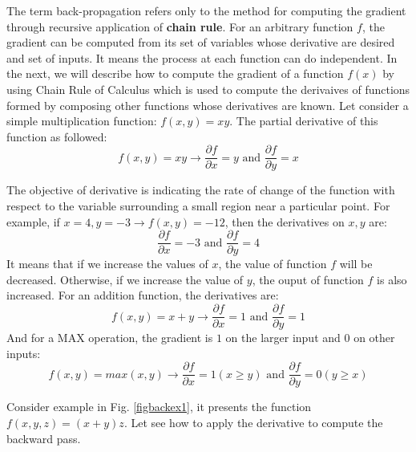 The term back-propagation refers only to the method for computing the gradient through recursive application of \textbf{chain rule}. For an arbitrary function $f$, the gradient can be computed from its set of variables whose derivative are desired and set of inputs. It means the process at each function can do independent. In the next, we will describe how to compute the gradient of a function $f(x)$ by using Chain Rule of Calculus which is used to compute the derivaives of functions formed by composing other functions whose derivatives are known.
Let consider a simple multiplication function: $f(x,y) = xy$. The partial derivative of this function as followed:
\begin{equation}
	f(x,y) = xy \rightarrow \frac{\partial f}{\partial x} = y \text{ and } \frac{\partial f}{\partial y} = x
\end{equation}

The objective of derivative is indicating the rate of change of the function with respect to the variable surrounding a small region near a particular point. For example, if $x = 4, y = -3 \rightarrow f(x,y) = -12$, then the derivatives on $x, y$ are:
\begin{equation}
	\frac{\partial f}{\partial x} = -3 \text{ and } \frac{\partial f}{\partial y} = 4
\end{equation}
It means that if we increase the values of $x$, the value of function $f$ will be decreased. Otherwise, if we increase the value of $y$, the ouput of function $f$ is also increased.
For an addition function, the derivatives are:
\begin{equation}
	f(x,y) = x + y \rightarrow \frac{\partial f}{\partial x} = 1 \text{ and } \frac{\partial f}{\partial y} = 1
\end{equation}
And for a MAX operation, the gradient is $1$ on the larger input and $0$ on other inputs:
\begin{equation}
	f(x,y) = max(x,y) \rightarrow \frac{\partial f}{\partial x} = 1 (x \geq y) \text{ and } \frac{\partial f}{\partial y} = 0 (y \geq x)
\end{equation}

Consider example in Fig. \ref{figbackex1}, it presents the function $f(x,y,z) = (x + y)z$. Let see how to apply the derivative to compute the backward pass.

